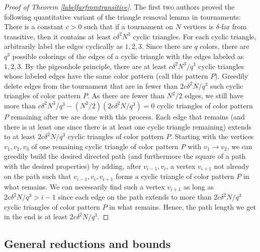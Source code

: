 \documentclass[11pt,reqno]{amsart}
\theoremstyle{definition}
\newcommand\1{\mathbf{1}}
\begin{document}
\begin{proof}[Proof of Theorem \ref{labelfarfromtransitive}]
The first two authors \cite[Lemma 1.3]{FoSu} proved the following quantitative variant of the triangle removal lemma in tournaments: There is a constant $c >0$ such that if a tournament on $N$ vertices is $\delta$-far from  transitive, then it contains at least $c\delta^2 N^3$ cyclic  triangles. For each cyclic triangle, arbitrarily label the edges cyclically as $1,2,3$. Since there are $q$ colors, there are $q^3$ possible colorings of the edges of a cyclic triangle with the edges labeled as $1,2,3$. By the pigeonhole principle, there are at least $c\delta^2 N^3/q^3$ cyclic triangles whose labeled edges have the same color pattern (call this pattern $P$). Greedily delete edges from the tournament that are in fewer than $2c\delta^2 N/q^3$ such cyclic triangles of color pattern $P$.  As there are fewer than $N^2/2$ edges, we still have more than $c\delta^2 N^3/q^3 - (N^2/2)(2c\delta^2 N/q^3)=0$ cyclic triangles of color pattern $P$ remaining after we are done with this process. Each edge that remains (and there is at least one since there is at least one cyclic triangle remaining) extends to at least $2c\delta^2 N/q^3$ cyclic triangles of color pattern $P$. Starting with the vertices $v_1,v_2,v_3$ of one remaining cyclic triangle of color pattern $P$ with $v_1 \rightarrow v_2$, we can greedily build the desired directed path (and furthermore the square of a path with the desired properties) by adding, after $v_{i-1},v_i$, a vertex $v_{i+1}$ not already on the path such that $v_{i-1},v_i,v_{i+1}$ forms a cyclic triangle of color pattern $P$ in what remains. We can necessarily find such a vertex $v_{i+1}$ as long as $2c\delta^2 N/q^3 > i-1$ since each edge on the path extends to more than $2c\delta^2 N/q^3$ cyclic triangles of color pattern $P$ in what remains. Hence, the path length we get in the end is at least $2c\delta^2 N/q^3$. 
\end{proof} 



\subsection{General reductions and bounds}



 
\end{document}
